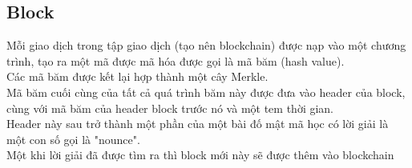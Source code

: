 \documentclass[12pt,a4paper]{article}
\begin{document}
\subsection{Block}

Mỗi giao dịch trong tập giao dịch (tạo nên blockchain) được nạp vào một chương trình, tạo ra một mã được mã hóa được gọi là mã băm (hash value).\\
Các mã băm được kết lại hợp thành một cây Merkle.\\
Mã băm cuối cùng của tất cả quá trình băm này được đưa vào header của block, cùng với mã băm của header block trước nó và một tem thời gian.\\
Header này sau trở thành một phần của một bài đố mật mã học có lời giải là một con số gọi là "nounce".\\
Một khi lời giải đã được tìm ra thì block mới này sẽ được thêm vào blockchain


\end{document}
